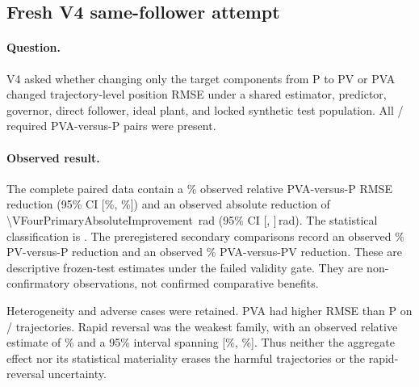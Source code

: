 \begin{table}[t]
  \centering
  \caption{Frozen direct-method runtime after per-trajectory warm-up.  This
  population is separate from the command-profile audit and reports measured,
  not worst-case, execution time.}
  \label{tab:v3-runtime}
  \small
  
\end{table}

\subsection{Fresh V4 same-follower attempt}
\label{sec:results-v4}

\paragraph{Question.}
V4 asked whether changing only the target components from P to PV or PVA
changed trajectory-level position RMSE under a shared estimator, predictor,
governor, direct follower, ideal plant, and locked synthetic test population.
All \VFourPrimaryPairedTrajectoryCount/\VFourTestTrajectoryCount{} required
PVA-versus-P pairs were present.

\paragraph{Observed result.}
The complete paired data contain a
\VFourPrimaryRelativeImprovement\% observed relative PVA-versus-P RMSE
reduction (95\% CI
[\VFourPrimaryRelativeCILow\%, \VFourPrimaryRelativeCIHigh\%]) and an observed
absolute reduction of \SI{\VFourPrimaryAbsoluteImprovement}{\radian}
(95\% CI
[\VFourPrimaryAbsoluteCILow, \VFourPrimaryAbsoluteCIHigh]\,rad).
The statistical classification is
\texttt{\VFourStatisticalClassification}.  The preregistered secondary
comparisons record an observed \VFourPVRelativeImprovement\% PV-versus-P
reduction and an observed \VFourPVAVersusPVRelativeImprovement\%
PVA-versus-PV reduction.  These are descriptive frozen-test estimates under
the failed validity gate.  They are non-confirmatory observations, not
confirmed comparative benefits.

Heterogeneity and adverse cases were retained.  PVA had higher RMSE than P on
\VFourHarmfulCount/\VFourHarmfulDenominator{} trajectories.  Rapid reversal
was the weakest family, with an observed relative estimate of
\VFourRapidReversalRelativeImprovement\% and a 95\% interval spanning
[\VFourRapidReversalRelativeCILow\%, \VFourRapidReversalRelativeCIHigh\%].
Thus neither the aggregate effect nor its statistical materiality erases the
harmful trajectories or the rapid-reversal uncertainty.

